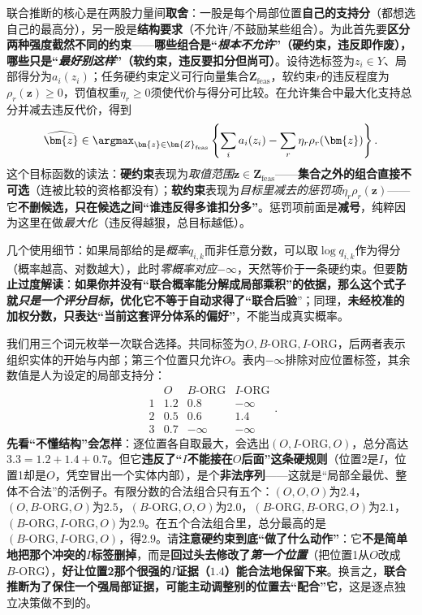 联合推断的核心是在两股力量间\textbf{取舍}：一股是每个局部位置\textbf{自己的支持分}（都想选自己的最高分），另一股是\textbf{结构要求}（不允许/不鼓励某些组合）。为此首先要\textbf{区分两种强度截然不同的约束}——\textbf{哪些组合是“\emph{根本不允许}”（硬约束，违反即作废），哪些只是“\emph{最好别这样}”（软约束，违反要扣分但尚可）}。设待选标签为$z_i\in Y$、局部得分为$a_i(z_i)$；任务硬约束定义可行向量集合$\bm{Z}_{\mathrm{feas}}$，软约束$r$的违反程度为$\rho_r(\bm{z})\geq0$，罚值权重$\eta_r\geq0$须使代价与得分可比较。在允许集合中最大化支持总分并减去违反代价，得到
\begin{equation}
  \widehat{\bm{z}}
  \in\argmax_{\bm{z}\in\bm{Z}_{\mathrm{feas}}}
  \left\{
    \sum_i a_i(z_i)
    -\sum_r\eta_r\rho_r(\bm{z})
  \right\}.
  \label{eq:knowledge-fusion-structured-objective}
\end{equation}
这个目标函数的读法：\textbf{硬约束}表现为\emph{取值范围}$\bm{z}\in\bm{Z}_{\mathrm{feas}}$——\textbf{集合之外的组合直接不可选}（连被比较的资格都没有）；\textbf{软约束}表现为\emph{目标里减去的惩罚项}$\eta_r\rho_r(\bm{z})$——它\textbf{不删候选，只在候选之间“谁违反得多谁扣分多”}。惩罚项前面是\textbf{减号}，纯粹因为这里在做\emph{最大化}（违反得越狠，总目标越低）。

几个使用细节：如果局部给的是\emph{概率}$q_{i,k}$而非任意分数，可以取$\log q_{i,k}$作为得分（概率越高、对数越大），此时\emph{零概率对应$-\infty$}，天然等价于一条硬约束。但要\textbf{防止过度解读}：\textbf{如果你并没有“联合概率能分解成局部乘积”的依据，那么这个式子就\emph{只是一个评分目标}，优化它\textbf{不等于}自动求得了“联合后验}”；同理，\textbf{未经校准的加权分数，只表达“当前这套评分体系的偏好”}，不能当成真实概率。

我们用三个词元枚举一次联合选择。共同标签为$O,B\text{-ORG},I\text{-ORG}$，后两者表示组织实体的开始与内部；第三个位置只允许$O$。表内$-\infty$排除对应位置标签，其余数值是人为设定的局部支持分：
\[
  \begin{array}{c|ccc}
    & O & B\text{-ORG} & I\text{-ORG} \\
    \hline
    1 & 1.2 & 0.8 & -\infty \\
    2 & 0.5 & 0.6 & 1.4 \\
    3 & 0.7 & -\infty & -\infty
  \end{array}.
\]
\textbf{先看“不懂结构”会怎样}：逐位置各自取最大，会选出$(O,I\text{-ORG},O)$，总分高达$3.3=1.2+1.4+0.7$。但它\textbf{违反了“$I$不能接在$O$后面”这条硬规则}（位置2是$I$，位置1却是$O$，凭空冒出一个实体内部），是个\textbf{非法序列}——这就是“局部全最优、整体不合法”的活例子。有限分数的合法组合只有五个：$(O,O,O)$为$2.4$，$(O,B\text{-ORG},O)$为$2.5$，$(B\text{-ORG},O,O)$为$2.0$，$(B\text{-ORG},B\text{-ORG},O)$为$2.1$，$(B\text{-ORG},I\text{-ORG},O)$为$2.9$。在五个合法组合里，总分最高的是$(B\text{-ORG},I\text{-ORG},O)$，得$2.9$。请\textbf{注意硬约束到底“做了什么动作”}：它\textbf{不是简单地把那个冲突的$I$标签删掉}，而是\textbf{回过头去修改了\emph{第一个位置}}（把位置1从$O$改成$B\text{-ORG}$），\textbf{好让位置2那个很强的$I$证据（$1.4$）能合法地保留下来}。换言之，\textbf{联合推断为了保住一个强局部证据，可能主动调整别的位置去“配合”它}，这是逐点独立决策做不到的。

